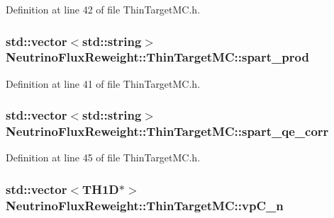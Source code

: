 Definition at line 42 of file Thin\-Target\-M\-C.\-h.

\hypertarget{class_neutrino_flux_reweight_1_1_thin_target_m_c_a8b097fbcafb5d79a77af2ca8324309a7}{
\subsubsection[{spart\-\_\-prod}]{\setlength{\rightskip}{0pt plus 5cm}std\-::vector$<$std\-::string$>$ Neutrino\-Flux\-Reweight\-::\-Thin\-Target\-M\-C\-::spart\-\_\-prod\hspace{0.3cm}{\ttfamily [private]}}}\label{class_neutrino_flux_reweight_1_1_thin_target_m_c_a8b097fbcafb5d79a77af2ca8324309a7}


Definition at line 41 of file Thin\-Target\-M\-C.\-h.

\hypertarget{class_neutrino_flux_reweight_1_1_thin_target_m_c_a475e8cd56d65e30e374d6f7ca4a20228}{
\subsubsection[{spart\-\_\-qe\-\_\-corr}]{\setlength{\rightskip}{0pt plus 5cm}std\-::vector$<$std\-::string$>$ Neutrino\-Flux\-Reweight\-::\-Thin\-Target\-M\-C\-::spart\-\_\-qe\-\_\-corr\hspace{0.3cm}{\ttfamily [private]}}}\label{class_neutrino_flux_reweight_1_1_thin_target_m_c_a475e8cd56d65e30e374d6f7ca4a20228}


Definition at line 45 of file Thin\-Target\-M\-C.\-h.

\hypertarget{class_neutrino_flux_reweight_1_1_thin_target_m_c_a929d19c1e5e17738376ecea2b91fe861}{
\subsubsection[{vp\-C\-\_\-n}]{\setlength{\rightskip}{0pt plus 5cm}std\-::vector$<$T\-H1\-D$\ast$$>$ Neutrino\-Flux\-Reweight\-::\-Thin\-Target\-M\-C\-::vp\-C\-\_\-n\hspace{0.3cm}{\ttfamily [private]}}}\label{class_neutrino_flux_reweight_1_1_thin_target_m_c_a929d19c1e5e17738376ecea2b91fe861}


